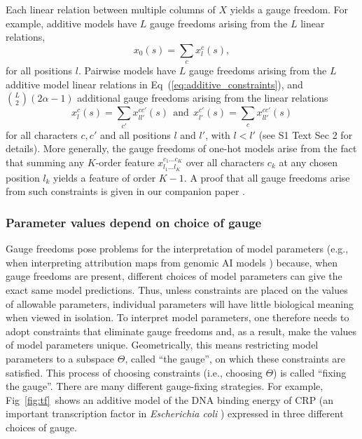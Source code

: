 \documentclass[10pt,letterpaper]{article}
\newcommand{\eq}[1]{Eq\ (\ref{#1})}
\newcommand{\fig}[2]{Fig\ \ref{#1}#2}
\newcommand{\si}[1]{{S1 Text Sec #1}}
\begin{document}
Each linear relation between multiple columns of $X$ yields a gauge freedom. For example, additive models have $L$ gauge freedoms arising from the $L$ linear relations,
\begin{equation}
    x_0(s) = \sum_c x_l^c(s), \label{eq:additive_constraints}
\end{equation}
for all positions $l$. Pairwise models have $L$ gauge freedoms arising from the $L$ additive model linear relations in \eq{eq:additive_constraints}, and ${L \choose 2}(2\alpha-1)$ additional gauge freedoms arising from the linear relations
\begin{equation}
    x_l^c(s) = \sum_{c'} x_{l l'}^{c c'}(s)~~\textrm{and}~~x_{l'}^{c'}(s) = \sum_{c} x_{l l'}^{c c'}(s)
\end{equation}
for all characters $c, c'$ and all positions $l$ and $l'$, with $l < l'$ (see \si{2} for details). More generally, the gauge freedoms of one-hot models arise from the fact that summing any $K$-order feature $x_{l_1 \ldots l_K}^{c_1 \ldots c_K}$ over all characters $c_k$ at any chosen position $l_k$ yields a feature of order $K-1$. A proof that all gauge freedoms arise from such constraints is given in our companion paper \cite{Posfai:2024bb}.


\subsubsection*{Parameter values depend on choice of gauge}

Gauge freedoms pose problems for the interpretation of model parameters (e.g., when interpreting attribution maps from genomic AI models \cite{majdandzic2023correcting}) because, when gauge freedoms are present, different choices of model parameters can give the exact same model predictions. Thus, unless constraints are placed on the values of allowable parameters, individual parameters will have little biological meaning when viewed in isolation. To interpret model parameters, one therefore needs to adopt constraints that eliminate gauge freedoms and, as a result, make the values of model parameters unique. Geometrically, this means restricting model parameters to a subspace $\Theta$, called ``the gauge'', on which these constraints are satisfied. This process of choosing constraints (i.e., choosing $\Theta$) is called ``fixing the gauge''. There are many different gauge-fixing strategies. For example, \fig{fig:tf}\ shows an additive model of the DNA binding energy of CRP (an important transcription factor in \textit{Escherichia coli} \cite{Busby:1999hb}) expressed in three different choices of gauge. 
\end{document}
